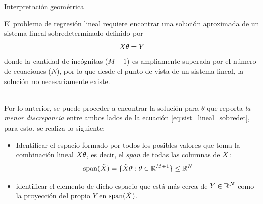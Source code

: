 \documentclass[handout, 9pt]{beamer}
\begin{document}
\begin{frame}{Interpretación geométrica}

El problema de regresión lineal requiere encontrar una solución aproximada de un sistema lineal sobredeterminado definido por 
\begin{equation*}
	\tilde{X} \theta = Y\label{eq:sist_lineal_sobredet}
\end{equation*}
donde la cantidad de incógnitas ($M+1$) es ampliamente superada por el número de ecuaciones ($N$), por lo que desde el punto de vista de un sistema lineal, la solución no necesariamente existe.\\~\ \pause

Por lo anterior, se puede proceder a encontrar la solución para $\theta$ que reporta \emph{la menor discrepancia} entre ambos lados de la ecuación \eqref{eq:sist_lineal_sobredet}, para esto, se realiza lo siguiente:\pause

\begin{itemize}
	\item Identificar el espacio formado por todos los posibles valores que toma la combinación lineal $\tilde{X} \theta$, es decir, el \emph{span} de todas las columnas de $\tilde{X}$:
	\begin{equation*}
		\text{span}(\tilde{X}) = \{\tilde{X}\theta:\theta\in\mathbb{R}^{M+1}\}\leq \mathbb{R}^N
	\end{equation*}\pause
	\item identificar el elemento de dicho espacio que está más cerca de $Y\in\mathbb{R}^N$  como la proyección del propio $Y$ en $\text{span}(\tilde{X})$.
\end{itemize}

\end{frame}
\end{document}
